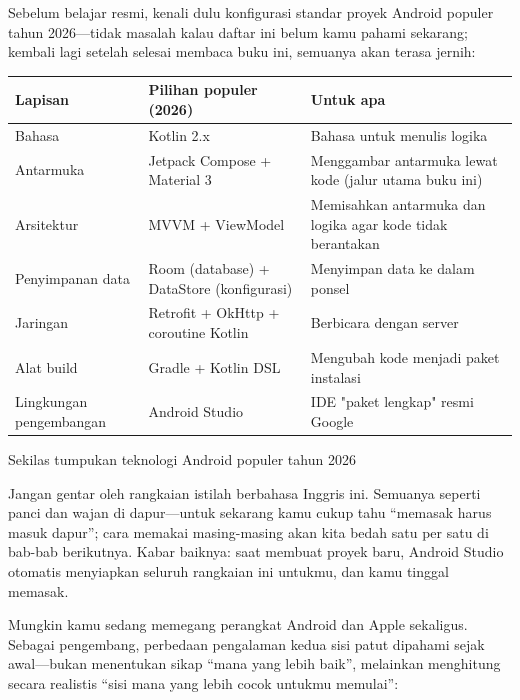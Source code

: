 
Sebelum belajar resmi, kenali dulu konfigurasi standar proyek Android populer tahun 2026—tidak masalah kalau daftar ini belum kamu pahami sekarang; kembali lagi setelah selesai membaca buku ini, semuanya akan terasa jernih:

\begin{center}
\begin{tabularx}{\linewidth}{|X|X|X|}
\hline
\textbf{Lapisan} & \textbf{Pilihan populer (2026)} & \textbf{Untuk apa} \tabularnewline
\hline
Bahasa & Kotlin 2.x & Bahasa untuk menulis logika \tabularnewline
Antarmuka & Jetpack Compose + Material 3 & Menggambar antarmuka lewat kode (jalur utama buku ini) \tabularnewline
Arsitektur & MVVM + ViewModel & Memisahkan antarmuka dan logika agar kode tidak berantakan \tabularnewline
Penyimpanan data & Room (database) + DataStore (konfigurasi) & Menyimpan data ke dalam ponsel \tabularnewline
Jaringan & Retrofit + OkHttp + coroutine Kotlin & Berbicara dengan server \tabularnewline
Alat build & Gradle + Kotlin DSL & Mengubah kode menjadi paket instalasi \tabularnewline
Lingkungan pengembangan & Android Studio & IDE "paket lengkap" resmi Google \tabularnewline
\hline
\end{tabularx}
\end{center}

\begin{center}\small\color{gray}Sekilas tumpukan teknologi Android populer tahun 2026\end{center}

Jangan gentar oleh rangkaian istilah berbahasa Inggris ini. Semuanya seperti panci dan wajan di dapur—untuk sekarang kamu cukup tahu “memasak harus masuk dapur”; cara memakai masing-masing akan kita bedah satu per satu di bab-bab berikutnya. Kabar baiknya: saat membuat proyek baru, Android Studio otomatis menyiapkan seluruh rangkaian ini untukmu, dan kamu tinggal memasak.


Mungkin kamu sedang memegang perangkat Android dan Apple sekaligus. Sebagai pengembang, perbedaan pengalaman kedua sisi patut dipahami sejak awal—bukan menentukan sikap “mana yang lebih baik”, melainkan menghitung secara realistis “sisi mana yang lebih cocok untukmu memulai”:

